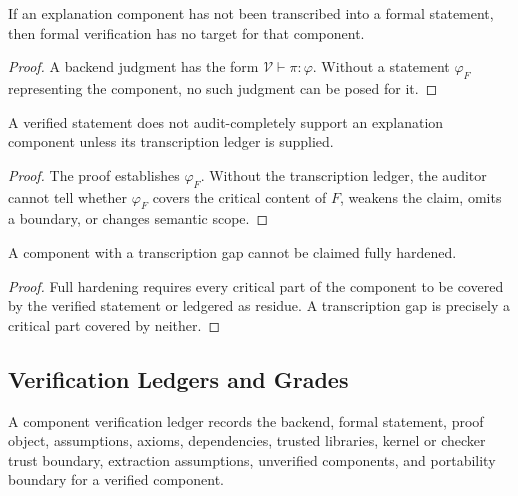 \begin{theorem}
\label{thm:philosophy-untranscribed-claims-no-proof-target}
If an explanation component has not been transcribed into a formal
statement, then formal verification has no target for that component.
\end{theorem}
\begin{proof}
A backend judgment has the form
$\mathcal V\vdash\pi:\varphi$. Without a statement $\varphi_F$
representing the component, no such judgment can be posed for it.
\end{proof}

\begin{theorem}
\label{thm:philosophy-verified-statement-needs-transcription-ledger}
A verified statement does not audit-completely support an explanation
component unless its transcription ledger is supplied.
\end{theorem}
\begin{proof}
The proof establishes $\varphi_F$. Without the transcription ledger, the
auditor cannot tell whether $\varphi_F$ covers the critical content of
$F$, weakens the claim, omits a boundary, or changes semantic scope.
\end{proof}

\begin{theorem}
\label{thm:philosophy-transcription-gaps-block-full-hardening}
A component with a transcription gap cannot be claimed fully hardened.
\end{theorem}
\begin{proof}
Full hardening requires every critical part of the component to be
covered by the verified statement or ledgered as residue. A transcription
gap is precisely a critical part covered by neither.
\end{proof}

\subsection{Verification Ledgers and Grades}
\label{subsec:philosophy-verification-ledgers-grades}

\begin{definition}
\label{def:philosophy-component-verification-ledger}
A component verification ledger records the backend, formal statement,
proof object, assumptions, axioms, dependencies, trusted libraries,
kernel or checker trust boundary, extraction assumptions, unverified
components, and portability boundary for a verified component.
\end{definition}

